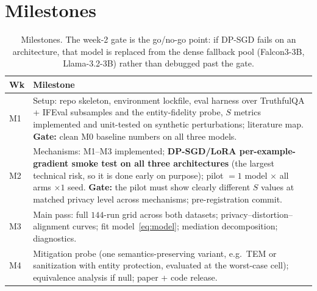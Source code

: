 \documentclass{article}
\theoremstyle{definition}
\theoremstyle{plain}
\theoremstyle{remark}
\newcommand{\Sdist}{S}
\newcommand{\seclabel}[1]{\label{sec:#1}}
\begin{document}
\section{Milestones}\seclabel{milestones}
\begin{table}[h]
\centering\small
\begin{tabular}{@{}p{}p{}@{}}
\toprule
Wk & Milestone \\
\midrule
M1 & Setup: repo skeleton, environment lockfile, eval harness over TruthfulQA
 + IFEval subsamples and the entity-fidelity probe, $\Sdist$ metrics implemented and unit-tested on
 synthetic perturbations; literature map. \textbf{Gate:} clean M0 baseline
 numbers on all three models. \\
M2 & Mechanisms: M1--M3 implemented; \textbf{DP-SGD/LoRA per-example-gradient
 smoke test on all three architectures} (the largest technical risk, so it
 is done early on purpose); pilot $=1$ model $\times$ all arms $\times 1$
 seed. \textbf{Gate:} the pilot must show clearly different $\Sdist$ values
 at matched privacy level across mechanisms; pre-registration commit. \\
M3 & Main pass: full $144$-run grid across both datasets;
 privacy--distortion--alignment curves; fit model~\eqref{eq:model};
 mediation decomposition; diagnostics. \\
M4 & Mitigation probe (one semantics-preserving variant, e.g.\ TEM or
 sanitization with entity protection, evaluated at the worst-case cell);
 equivalence analysis if null; paper + code release. \\
\bottomrule
\end{tabular}
\caption{Milestones. The week-2 gate is the go/no-go point: if DP-SGD fails on
an architecture, that model is replaced from the dense fallback pool
(Falcon3-3B, Llama-3.2-3B) rather than debugged past the gate.}
\label{tab:miles}
\end{table}
\end{document}
